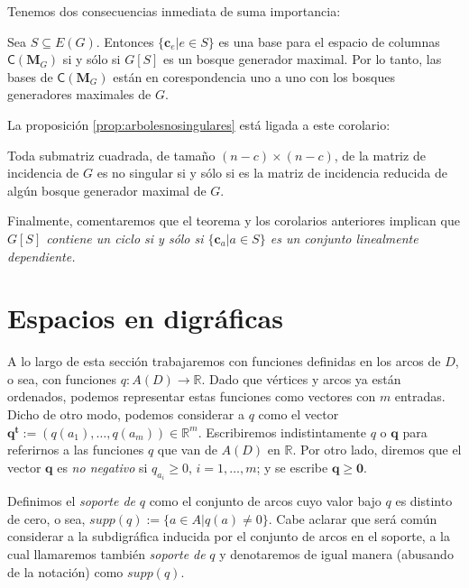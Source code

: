  Tenemos dos consecuencias inmediata de suma importancia:
 
\begin{cor} Sea
$S\subseteq E(G)$. Entonces $\{\mathbf{c}_{e} | e \in S\}$ es una base para el espacio de columnas $\mathsf{C}(\mathbf{M}_{G})$ si y sólo si $G[S]$ es un bosque generador maximal. Por lo tanto, las bases de $\mathsf{C}(\mathbf{M}_{G})$ están en corespondencia uno a uno con los bosques generadores maximales de $G$.
\end{cor} 

La proposición \ref{prop:arbolesnosingulares} está ligada a este corolario:

\begin{cor}
Toda submatriz cuadrada, de tamaño $(n-c) \times (n-c)$, de la matriz de incidencia de $G$ es no singular si y sólo si es la matriz de incidencia reducida de algún bosque generador maximal de $G$.
\end{cor}
 
Finalmente, comentaremos que el teorema y los corolarios anteriores implican que \textit{$G[S]$ contiene un ciclo si y sólo si $\{\mathbf{c}_{a} | a \in S\}$ es un conjunto linealmente dependiente.} 



\section{Espacios en digráficas}
A lo largo de esta sección trabajaremos con funciones definidas en los arcos de $D$, o sea, con funciones $q \colon A(D) \rightarrow \mathbb{R}$. Dado que vértices y arcos ya están ordenados, podemos representar estas funciones como vectores con $m$ entradas. Dicho de otro modo, podemos considerar a $q$ como el vector $\mathbf{q^{t}} := (q(a_{1}), \ldots, q(a_{m})) \in \mathbb{R}^{m}$. Escribiremos indistintamente $q$ o $\mathbf{q}$ para referirnos a las funciones $q$ que van de $A(D)$ en $\mathbb{R}$. Por otro lado, diremos que el vector $\mathbf{q}$ es \textit{no negativo} si $q_{a_{i}} \geq 0$, $i = 1, \ldots, m$; y se escribe $\mathbf{q} \geq \mathbf{0}$.

Definimos el \textit{soporte de} $q$ como el conjunto de arcos cuyo valor bajo $q$ es distinto de cero, o sea, $
supp(q) := \{a \in A | q(a) \neq 0\}.$ Cabe aclarar que será común considerar a la subdigráfica inducida por el conjunto de arcos en el soporte, a la cual llamaremos también \textit{soporte de} $q$ y denotaremos de igual manera (abusando de la notación) como $supp(q)$.
 
